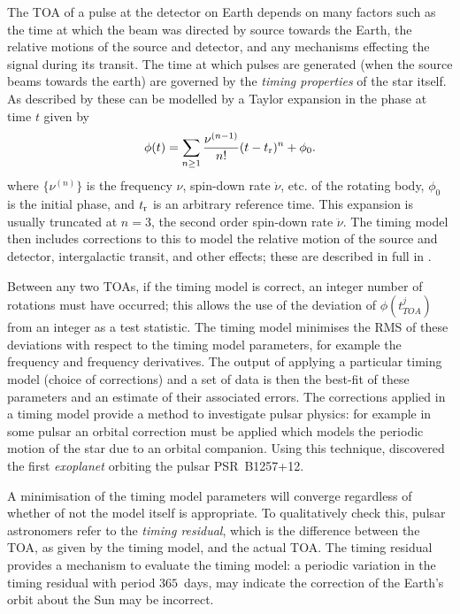 The TOA of a pulse at the detector on Earth depends on many factors such as the
time at which the beam was directed by source towards the Earth, the relative
motions of the source and detector, and any mechanisms effecting the signal during
its transit. The time at which pulses are generated (when the source beams towards
the earth) are governed by the \emph{timing properties} of the star itself.
As described by \citet{Edwards2006} these can be modelled by a Taylor expansion
in the phase at time $t$ given by
\begin{equation}
\phi(t) = \sum_{n\ge 1}\frac{\nu^{(n-1)}}{n!}(t - t_{\textrm{r}})^{n} + \phi_{0}.
\label{eqn: Taylor compact}
\end{equation} 
where $\{\nu^{(n)}\}$ is the frequency $\nu$, spin-down rate $\dot{\nu}$, etc.
of the rotating body, $\phi_0$ is the initial phase, and $t_{\textrm{r}}$ is an
arbitrary reference time. This expansion is usually truncated at $n=3$, the
second order spin-down rate $\ddot{\nu}$. The timing model then includes
corrections to this to model the relative motion of the source and detector,
intergalactic transit, and other effects; these are described in full in
\citet{Edwards2006}. 

Between any two TOAs, if the timing model is correct, an integer number of
rotations must have occurred; this allows the use of the deviation of
$\phi(t_{TOA}^{j})$ from an integer as a test statistic. The timing model
minimises the RMS of these deviations with respect to the timing model
parameters, for example the frequency and frequency derivatives. The output of
applying a particular timing model (choice of corrections) and a set of data is
then the best-fit of these parameters and an estimate of their associated
errors.  The corrections applied in a timing model provide a method to
investigate pulsar physics: for example in some pulsar an orbital correction
must be applied which models the periodic motion of the star due to an orbital
companion. Using this technique, \citet{wolszczan1992planetary} discovered the
first \emph{exoplanet} orbiting the pulsar PSR~B1257+12.

A minimisation of the timing model parameters will converge regardless of
whether of not the model itself is appropriate. To qualitatively check this,
pulsar astronomers refer to the \emph{timing residual}, which is the difference
between the TOA, as given by the timing model, and the actual TOA. The timing
residual provides a mechanism to evaluate the timing model: a periodic
variation in the timing residual with period $365$~days, may indicate the correction
of the Earth's orbit about the Sun may be incorrect.

